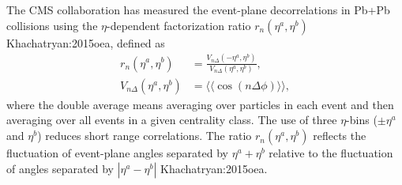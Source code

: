 The CMS collaboration has measured the event-plane decorrelations in Pb+Pb collisions using the $\eta$-dependent factorization ratio $r_n(\eta^a, \eta^b)$ {Khachatryan:2015oea}, defined as
\begin{align}
  r_n(\eta^a, \eta^b) &= \frac{V_{n\Delta}(-\eta^a, \eta^b)}{V_{n\Delta}(\eta^a, \eta^b)}, \\
  V_{n\Delta}(\eta^a, \eta^b) &= \langle\langle \cos(n\Delta\phi) \rangle\rangle,
\end{align}
where the double average means averaging over particles in each event and then averaging over all events in a given centrality class. 
The use of three $\eta$-bins ($\pm \eta^a$ and $\eta^b$) reduces short range correlations.
The ratio $r_n(\eta^a, \eta^b)$ reflects the fluctuation of event-plane angles separated by $\eta^a+\eta^b$ relative to the fluctuation of angles separated by  $|\eta^a-\eta^b|$ {Khachatryan:2015oea}.

